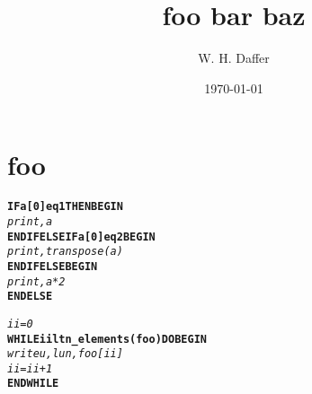 \documentclass{report}
\title{foo bar baz}
\author{W. H. Daffer}
\date{\today}
\begin{document}
\maketitle

\chapter{foo}




\begin{alltt}

\textbf{IF a[0] eq 1 THEN BEGIN}
  \textit{print,a}
\textbf{ENDIF ELSE IF a[0] eq 2 BEGIN}
  \textit{print,transpose(a)}
\textbf{ENDIF ELSE BEGIN}
  \textit{print,a*2}
\textbf{ENDELSE}

\end{alltt}


\begin{alltt}

\textit{ii=0}
\textbf{WHILE ii lt n_elements(foo) DO BEGIN}
  \textit{writeu, lun, foo[ii] }
  \textit{ii=ii+1}
\textbf{ENDWHILE}

\end{alltt}
\end{document}
